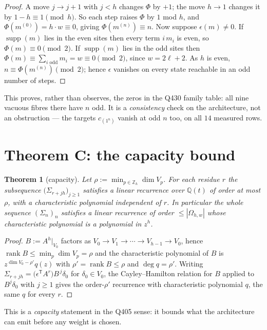 \documentclass[11pt]{article}
\theoremstyle{plain}
\newtheorem{theorem}{Theorem}
\theoremstyle{definition}
\theoremstyle{remark}
\newcommand{\supp}{\operatorname{supp}}
\begin{document}
\begin{proof}
A move $j\to j+1$ with $j<h$ changes $\Phi$ by $+1$; the move $h\to1$ changes it by
$1-h\equiv1\pmod h$. So each step raises $\Phi$ by $1$ mod $h$, and
$\Phi(m^{(0)})=h\cdot w\equiv0$, giving $\Phi(m^{(n)})\equiv n$. Now suppose $\epsilon(m)\ne0$.
If $\supp(m)$ lies in the even sites then every term $i\,m_i$ is even, so $\Phi(m)\equiv0\pmod2$.
If $\supp(m)$ lies in the odd sites then $\Phi(m)\equiv\sum_{i\text{ odd}}m_i=w\equiv0\pmod2$,
since $w=2\ell+2$. As $h$ is even, $n\equiv\Phi(m^{(n)})\pmod 2$; hence $\epsilon$ vanishes on
every state reachable in an odd number of steps.
\end{proof}

\noindent This proves, rather than observes, the zeros in the Q430 family table: all nine
vacuous fibres there have $n$ odd. It is a \emph{consistency} check on the architecture, not an
obstruction --- the targets $c_{(1^n)}$ vanish at odd $n$ too, on all $14$ measured rows.

\section{Theorem C: the capacity bound}

\begin{theorem}[capacity]\label{thm:cap}
Let $\rho:=\min_{p\in\mathbb{Z}_h}\dim V_p$. For each residue $r$ the subsequence
$\bigl(\Sigma_{r+jh}\bigr)_{j\ge1}$ satisfies a linear recurrence over $\mathbb{Q}(t)$ of order
at most $\rho$, with a characteristic polynomial \emph{independent of $r$}. In particular the
whole sequence $(\Sigma_n)_n$ satisfies a linear recurrence of order $\le|\Omega_{h,w}|$ whose
characteristic polynomial is a polynomial in $z^h$.
\end{theorem}

\begin{proof}
$B:=A^h|_{V_0}$ factors as $V_0\to V_1\to\cdots\to V_{h-1}\to V_0$, hence
$\operatorname{rank}B\le\min_p\dim V_p=\rho$ and the characteristic polynomial of $B$ is
$z^{\dim V_0-\rho'}q(z)$ with $\rho'=\operatorname{rank}B\le\rho$ and $\deg q=\rho'$. Writing
$\Sigma_{r+jh}=\bigl(\epsilon^{\mathsf T}A^{r}\bigr)B^{\,j}\delta_0$ for $\delta_0\in V_0$, the
Cayley--Hamilton relation for $B$ applied to $B^{j}\delta_0$ with $j\ge1$ gives the order-$\rho'$
recurrence with characteristic polynomial $q$, the same $q$ for every $r$.
\end{proof}

\noindent This is a \emph{capacity} statement in the Q405 sense: it bounds what the architecture
can emit before any weight is chosen.
\end{document}
